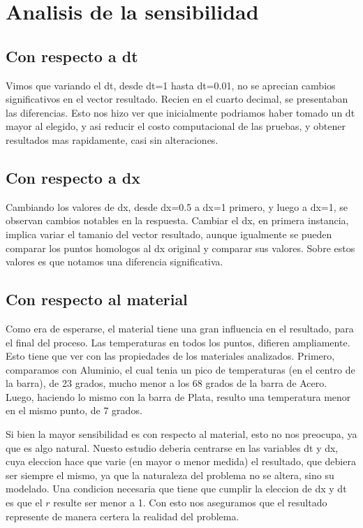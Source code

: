 \documentclass{article}
\begin{document}
\section{Analisis de la sensibilidad}
\subsection{Con respecto a dt}
Vimos que variando el dt, desde dt=1 hasta dt=0.01, no se aprecian
cambios significativos en el vector resultado. Recien en el cuarto
decimal, se presentaban las diferencias. Esto nos hizo ver que
inicialmente podriamos haber tomado un dt mayor al elegido, y asi
reducir el costo computacional de las pruebas, y obtener resultados
mas rapidamente, casi sin alteraciones.

\subsection{Con respecto a dx}
Cambiando los valores de dx, desde dx=0.5 a dx=1 primero, y luego a
dx=1, se observan cambios notables en la respuesta. Cambiar el dx, en
primera instancia, implica variar el tamanio del vector resultado,
aunque igualmente se pueden comparar los puntos homologos al dx
original y comparar sus valores. Sobre estos valores es que notamos
una diferencia significativa.

\subsection{Con respecto al material}
Como era de esperarse, el material tiene una gran influencia en el
resultado, para el final del proceso. Las temperaturas en todos los
puntos, difieren ampliamente. Esto tiene que ver con las propiedades
de los materiales analizados. 
Primero, comparamos con Aluminio, el cual tenia un pico de
temperaturas (en el centro de la barra), de 23 grados, mucho menor a
los 68 grados de la barra de Acero. Luego, haciendo lo mismo con la
barra de Plata, resulto una temperatura menor en el mismo punto, de 7
grados.

Si bien la mayor sensibilidad es con respecto al material, esto no nos
preocupa, ya que es algo natural. Nuesto estudio deberia centrarse en
las variables dt y dx, cuya eleccion hace que varie (en mayor o menor
medida) el resultado, que debiera ser siempre el mismo, ya que la
naturaleza del problema no se altera, sino su modelado. Una condicion
necesaria que tiene que cumplir la eleccion de dx y dt es que el
$r$ resulte ser menor a 1. Con esto nos aseguramos que el
resultado represente de manera certera la realidad del problema.
\end{document}
